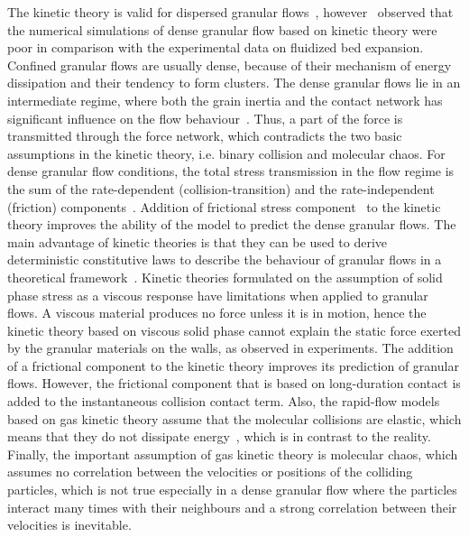 The kinetic theory is valid for dispersed granular flows~\citep{Ng2008}, 
however~\citet{Van2001} observed that the numerical simulations of dense 
granular flow based on kinetic theory were poor in comparison with the 
experimental data on fluidized bed expansion. Confined granular flows are 
usually dense, because of their mechanism of energy dissipation and their 
tendency to form clusters. The dense granular flows lie in an intermediate 
regime, where both the grain inertia and the contact network has significant 
influence on the flow behaviour~\citep{Pouliquen2002}. Thus, a part of the 
force is transmitted through the force network, which contradicts the two basic 
assumptions in the kinetic theory, i.e. binary collision and molecular chaos. 
For dense granular flow conditions, the total stress transmission in the flow 
regime is the sum of the rate-dependent (collision-transition) and the 
rate-independent (friction) components~\citep{Ng2008}. Addition of frictional 
stress component~\citep{Schaefer1987} to the kinetic theory improves the 
ability of the model to predict the dense granular flows. The main advantage of 
kinetic theories is that they can be used to derive deterministic constitutive 
laws to describe the behaviour of granular flows in a theoretical 
framework~\citep{Jenkins1983}. Kinetic theories formulated on the assumption of 
solid phase stress as a viscous response have limitations when applied to 
granular flows. A viscous material produces no force unless it is in motion, 
hence the kinetic theory based on viscous solid phase cannot explain the static 
force exerted by the granular materials on the walls, as observed in 
experiments. The addition of a frictional component to the kinetic theory 
improves its prediction of granular flows. However, the frictional component 
that is based on long-duration contact is added to the instantaneous collision 
contact term. Also, the rapid-flow models based on gas kinetic theory assume 
that the molecular collisions are elastic, which means that they do not 
dissipate energy~\citep{Campbell2006}, which is in contrast to the reality. 
Finally, the important assumption of gas kinetic theory is molecular chaos, 
which assumes no correlation between the velocities or positions of the 
colliding particles, which is not true especially in a dense granular flow 
where the particles interact many times with their neighbours and a strong 
correlation between their velocities is inevitable.


